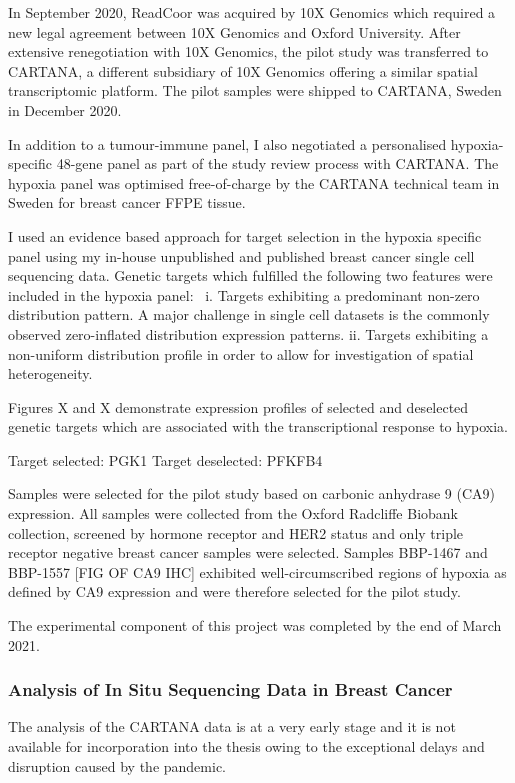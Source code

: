 In September 2020, ReadCoor was acquired by 10X Genomics which required a new legal agreement between 10X Genomics and Oxford University. After extensive renegotiation with 10X Genomics, the pilot study was transferred to CARTANA, a different subsidiary of 10X Genomics offering a similar spatial transcriptomic platform. The pilot samples were shipped to CARTANA, Sweden in December 2020. 

In addition to a tumour-immune panel, I also negotiated a personalised hypoxia-specific 48-gene panel as part of the study review process with CARTANA. The hypoxia panel was optimised free-of-charge by the CARTANA technical team in Sweden for breast cancer FFPE tissue. 

I used an evidence based approach for target selection in the hypoxia specific panel using my in-house unpublished and published \cite{2017_nat_comm_chung} breast cancer single cell sequencing data. Genetic targets which fulfilled the following two features were included in the hypoxia panel: \
i. Targets exhibiting a predominant non-zero distribution pattern.
A major challenge in single cell datasets is the commonly observed zero-inflated distribution expression patterns.
ii. Targets exhibiting a non-uniform distribution profile in order to allow for investigation of spatial heterogeneity.

Figures X and X demonstrate expression profiles of selected and deselected genetic targets which are associated with the transcriptional response to hypoxia.

Target selected: PGK1
Target deselected: PFKFB4

Samples were selected for the pilot study based on carbonic anhydrase 9 (CA9) expression. All samples were collected from the Oxford Radcliffe Biobank collection, screened by hormone receptor and HER2 status and only triple receptor negative breast cancer samples were selected. Samples BBP-1467 and BBP-1557 [FIG OF CA9 IHC] exhibited well-circumscribed regions of hypoxia as defined by CA9 expression and were therefore selected for the pilot study.

The experimental component of this project was completed by the end of March 2021.


\subsubsection{Analysis of In Situ Sequencing Data in Breast Cancer}
The analysis of the CARTANA data is at a very early stage and it is not available for incorporation into the thesis owing to the exceptional delays and disruption caused by the pandemic. 


